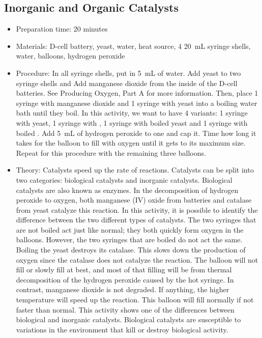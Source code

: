 \subsection{Inorganic and Organic Catalysts}
\begin{itemize}
\item{Preparation time: 20 minutes}
\item{Materials: D-cell battery, yeast, water, heat source, 4 20~mL syringe shells, water, balloons, hydrogen peroxide}
\item{Procedure: In all syringe shells, put in 5~mL of water. Add yeast to two syringe shells and Add manganese dioxide from the inside of the D-cell batteries. See Producing Oxygen, Part A for more information. Then, place 1 syringe with manganese dioxide and 1 syringe with yeast into a boiling water bath until they boil. In this activity, we want to have 4 variants: 1 syringe with yeast, 1 syringe with , 1 syringe with boiled yeast and 1 syringe with boiled . Add 5~mL of hydrogen peroxide to one and cap it. Time how long it takes for the balloon to fill with oxygen until it gets to its maximum size. Repeat for this procedure with the remaining three balloons.}
\item{Theory: Catalysts speed up the rate of reactions. Catalysts can be split into two categories: biological catalysts and inorganic catalysts. Biological catalysts are also known as enzymes. In the decomposition of hydrogen peroxide to oxygen, both manganese (IV) oxide from batteries and catalase from yeast catalyze this reaction. In this activity, it is possible to identify the difference between the two different types of catalysts. The two syringes that are not boiled act just like normal; they both quickly form oxygen in the balloons. However, the two syringes that are boiled do not act the same. Boiling the yeast destroys its catalase. This slows down the production of oxygen since the catalase does not catalyze the reaction. The balloon will not fill or slowly fill at best, and most of that filling will be from thermal decomposition of the hydrogen peroxide caused by the hot syringe. In contrast, manganese dioxide is not degraded. If anything, the higher temperature will speed up the reaction. This balloon will fill normally if not faster than normal. This activity shows one of the differences between biological and inorganic catalysts. Biological catalysts are susceptible to variations in the environment that kill or destroy biological activity.}
\end{itemize}

